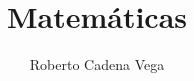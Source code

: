 



\title{Matemáticas}
\author{Roberto Cadena Vega}



    \maketitle

    \tableofcontents
    \listoftodos

    \clearpage
    

    \clearpage
    

    \clearpage
    



